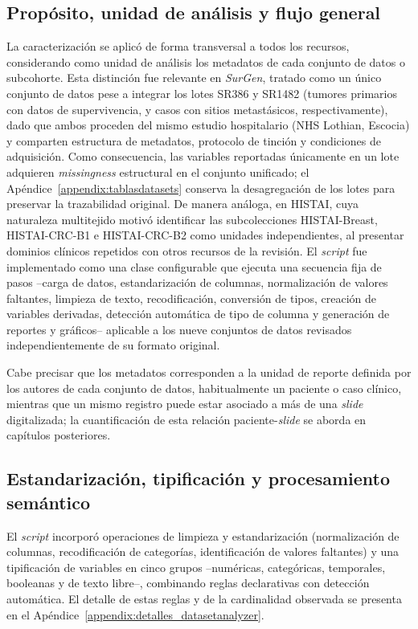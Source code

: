 \subsection{Propósito, unidad de análisis y flujo general}

La caracterización se aplicó de forma transversal a todos los recursos, considerando como unidad de análisis los metadatos de cada conjunto de datos o subcohorte. Esta distinción fue relevante en \textit{SurGen}, tratado como un único conjunto de datos pese a integrar los lotes SR386 y SR1482 (tumores primarios con datos de supervivencia, y casos con sitios metastásicos, respectivamente), dado que ambos proceden del mismo estudio hospitalario (NHS Lothian, Escocia) y comparten estructura de metadatos, protocolo de tinción y condiciones de adquisición.\label{sec:nota_unificacion_surgen} Como consecuencia, las variables reportadas únicamente en un lote adquieren \textit{missingness} estructural en el conjunto unificado; el Apéndice~\ref{appendix:tablasdatasets} conserva la desagregación de los lotes para preservar la trazabilidad original. De manera análoga, en HISTAI, cuya naturaleza multitejido motivó identificar las subcolecciones HISTAI-Breast, HISTAI-CRC-B1 e HISTAI-CRC-B2 como unidades independientes, al presentar dominios clínicos repetidos con otros recursos de la revisión. El \textit{script} fue implementado como una clase configurable que ejecuta una secuencia fija de pasos --carga de datos, estandarización de columnas, normalización de valores faltantes, limpieza de texto, recodificación, conversión de tipos, creación de variables derivadas, detección automática de tipo de columna y generación de reportes y gráficos-- aplicable a los nueve conjuntos de datos revisados independientemente de su formato original.

Cabe precisar que los metadatos corresponden a la unidad de reporte definida por los autores de cada conjunto de datos, habitualmente un paciente o caso clínico, mientras que un mismo registro puede estar asociado a más de una \textit{slide} digitalizada; la cuantificación de esta relación paciente-\textit{slide} se aborda en capítulos posteriores.

\subsection{Estandarización, tipificación y procesamiento semántico}

El \textit{script} incorporó operaciones de limpieza y estandarización (normalización de columnas, recodificación de categorías, identificación de valores faltantes) y una tipificación de variables en cinco grupos --numéricas, categóricas, temporales, booleanas y de texto libre--, combinando reglas declarativas con detección automática. El detalle de estas reglas y de la cardinalidad observada se presenta en el Apéndice~\ref{appendix:detalles_datasetanalyzer}.

